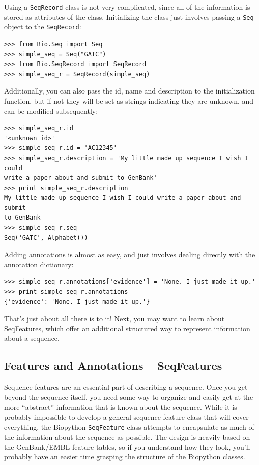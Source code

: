 \documentclass{report}
\begin{document}
Using a \verb|SeqRecord| class is not very complicated, since all of the information is stored as attributes of the class. Initializing the class just involves passing a \verb|Seq| object to the \verb|SeqRecord|:

\begin{verbatim}
>>> from Bio.Seq import Seq
>>> simple_seq = Seq("GATC")
>>> from Bio.SeqRecord import SeqRecord
>>> simple_seq_r = SeqRecord(simple_seq)
\end{verbatim}

Additionally, you can also pass the id, name and description to the initialization function, but if not they will be set as strings indicating they are unknown, and can be modified subsequently:

\begin{verbatim}
>>> simple_seq_r.id
'<unknown id>'
>>> simple_seq_r.id = 'AC12345'
>>> simple_seq_r.description = 'My little made up sequence I wish I could
write a paper about and submit to GenBank'
>>> print simple_seq_r.description
My little made up sequence I wish I could write a paper about and submit
to GenBank
>>> simple_seq_r.seq
Seq('GATC', Alphabet())
\end{verbatim}

Adding annotations is almost as easy, and just involves dealing directly with the annotation dictionary:

\begin{verbatim}
>>> simple_seq_r.annotations['evidence'] = 'None. I just made it up.'
>>> print simple_seq_r.annotations
{'evidence': 'None. I just made it up.'}
\end{verbatim}

That's just about all there is to it! Next, you may want to learn about SeqFeatures, which offer an additional structured way to represent information about a sequence.

\subsection{Features and Annotations -- SeqFeatures}
\label{sec:seq_features}

Sequence features are an essential part of describing a sequence. Once you get beyond the sequence itself, you need some way to organize and easily get at the more ``abstract'' information that is known about the sequence. While it is probably impossible to develop a general sequence feature class that will cover everything, the Biopython \verb|SeqFeature| class attempts to encapsulate as much of the information about the sequence as possible. The design is heavily based on the GenBank/EMBL feature tables, so if you understand how they look, you'll probably have an easier time grasping the structure of the Biopython classes.
\end{document}
